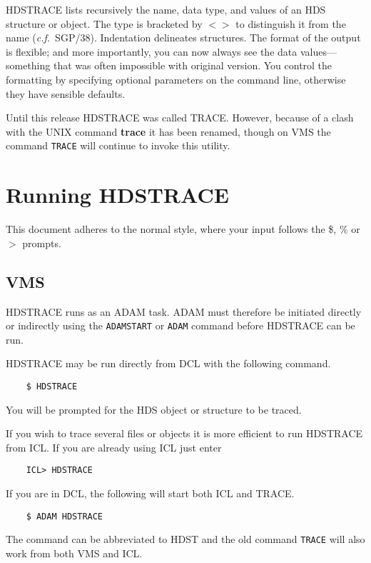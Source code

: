 {\footnotesize HDSTRACE} lists recursively the name, data type, and
values of an HDS structure or object.  The type is bracketed by $<>$ to
distinguish it from the name ({\it c.f.}\ SGP/38).  Indentation
delineates structures.  The format of the output is flexible; and more
importantly, you can now always see the data values---something that was
often impossible with original version.  You control the formatting by
specifying optional parameters on the command line, otherwise they have
sensible defaults.

Until this release {\footnotesize HDSTRACE} was called {\footnotesize
TRACE}. However, because of a clash with the UNIX command {\bf trace} it
has been renamed, though on VMS the command {\tt TRACE} will continue to
invoke this utility.


\section{Running HDSTRACE}
This document adheres to the normal style, where your input follows
the \$, \% or $>$ prompts.

\subsection{VMS}
{\footnotesize HDSTRACE} runs as an {\footnotesize ADAM} task.
{\footnotesize ADAM} must
therefore be initiated directly or indirectly using the {\tt ADAMSTART}
or {\tt ADAM} command before {\footnotesize HDSTRACE} can be run.

{\footnotesize HDSTRACE} may be run directly from DCL with the following
command.
\small
\begin{verbatim}
    $ HDSTRACE
\end{verbatim}
\normalsize
You will be prompted for the HDS object or structure to be traced.

If you wish to trace several files or objects
it is more efficient to run {\footnotesize HDSTRACE} from ICL.
If you are already using ICL just enter

\small
\begin{verbatim}
    ICL> HDSTRACE
\end{verbatim}
If you are in DCL, the following will start both ICL and {\footnotesize
TRACE}.
\begin{verbatim}
    $ ADAM HDSTRACE
\end{verbatim}
\normalsize
The command can be abbreviated to HDST and the old command {\tt TRACE}
will also work from both VMS and ICL.

